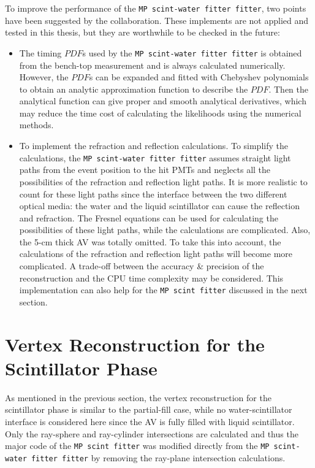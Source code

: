 To improve the performance of the \texttt{MP scint-water fitter fitter}, two points have been suggested by the collaboration. These implements are not applied and tested in this thesis, but they are worthwhile to be checked in the future:
\begin{itemize}
	\item The timing $PDF$s used by the \texttt{MP scint-water fitter fitter} is obtained from the bench-top measurement and is always calculated numerically. However, the $PDF$s can be expanded and fitted with Chebyshev polynomials to obtain an analytic approximation function to describe the $PDF$\cite{press2007numerical}. Then the analytical function can give proper and smooth analytical derivatives, which may reduce the time cost of calculating the likelihoods using the numerical methods.	
	\item To implement the refraction and reflection calculations. To simplify the calculations, the \texttt{MP scint-water fitter fitter} assumes straight light paths from the event position to the hit PMTs and neglects all the possibilities of the refraction and reflection light paths. It is more realistic to count for these light paths since the interface between the two different optical media: the water and the liquid scintillator can cause the reflection and refraction. The Fresnel equations can be used for calculating the possibilities of these light paths\cite{partialWater}, while the calculations are complicated. Also, the 5-cm thick AV was totally omitted. To take this into account, the calculations of the refraction and reflection light paths will become more complicated. A trade-off between the accuracy \& precision of the reconstruction and the CPU time complexity may be considered. This implementation can also help for the \texttt{MP scint fitter} discussed in the next section.
\end{itemize}

\section{Vertex Reconstruction for the Scintillator Phase}\label{sect:scintFitter}
As mentioned in the previous section, the vertex reconstruction for the scintillator phase is similar to the partial-fill case, while no water-scintillator interface is considered here since the AV is fully filled with liquid scintillator. Only the ray-sphere and ray-cylinder intersections are calculated and thus the major code of the \texttt{MP scint fitter} was modified directly from the \texttt{MP scint-water fitter fitter} by removing the ray-plane intersection calculations.

